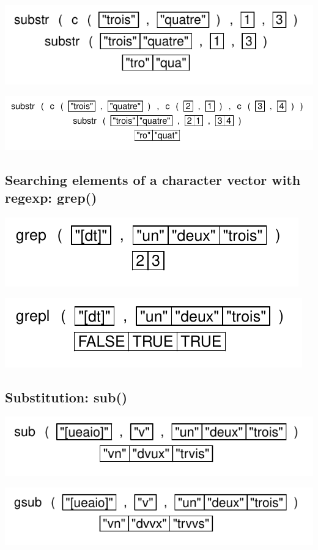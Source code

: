 \documentclass[pdflatex]{article}
\begin{document}
\includegraphics{substr_2.pdf}

\includegraphics{substr_3.pdf}

\subsection{Searching elements of a character vector with regexp: grep()}

\includegraphics{grep}

\includegraphics{grepl}

\subsection{Substitution: sub()}

\includegraphics{sub}

\includegraphics{gsub}
\end{document}
